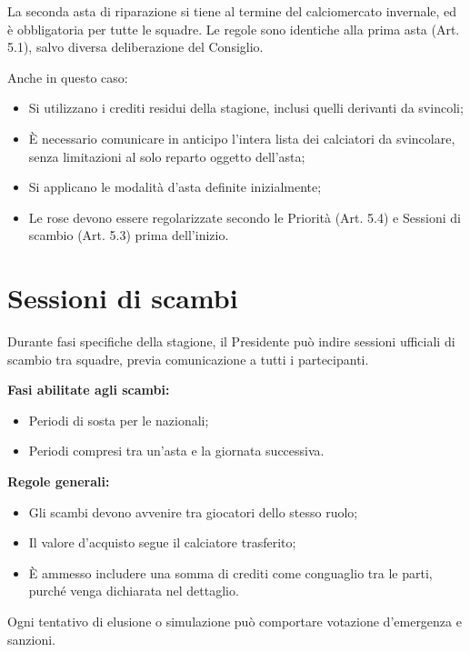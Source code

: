 La seconda asta di riparazione si tiene al termine del calciomercato invernale, ed è obbligatoria per tutte le squadre. Le regole sono identiche alla prima asta (Art. 5.1), salvo diversa deliberazione del Consiglio.

\noindent
Anche in questo caso:
\begin{itemize}
  \item Si utilizzano i crediti residui della stagione, inclusi quelli derivanti da svincoli;
  \item È necessario comunicare in anticipo l’intera lista dei calciatori da svincolare, senza limitazioni al solo reparto oggetto dell’asta;
  \item Si applicano le modalità d’asta definite inizialmente;
  \item Le rose devono essere regolarizzate secondo le Priorità (Art. 5.4) e Sessioni di scambio (Art. 5.3) prima dell'inizio.
\end{itemize}

\section{Sessioni di scambi}
\label{art:5.3}

Durante fasi specifiche della stagione, il Presidente può indire sessioni ufficiali di scambio tra squadre, previa comunicazione a tutti i partecipanti.

\noindent \textbf{Fasi abilitate agli scambi:}
\begin{itemize}
  \item Periodi di sosta per le nazionali;
  \item Periodi compresi tra un’asta e la giornata successiva.
\end{itemize}

\noindent \textbf{Regole generali:}
\begin{itemize}
  \item Gli scambi devono avvenire tra giocatori dello stesso ruolo;
  \item Il valore d’acquisto segue il calciatore trasferito;
  \item È ammesso includere una somma di crediti come conguaglio tra le parti, purché venga dichiarata nel dettaglio.
\end{itemize}

\noindent
Ogni tentativo di elusione o simulazione può comportare votazione d’emergenza e sanzioni.\\

